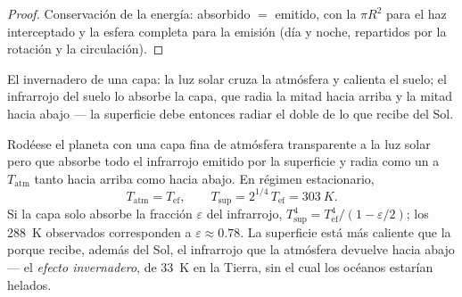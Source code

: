 \begin{proof}
Conservación de la energía: absorbido $= $ emitido, con la  $\pi R^2$
para el haz interceptado y la esfera completa para la emisión (día y
noche, repartidos por la rotación y la circulación).
\end{proof}

\begin{omfigure}

{\small El invernadero de una capa: la luz solar cruza la atmósfera y
calienta el suelo; el infrarrojo del suelo lo absorbe la capa, que
radia la mitad hacia arriba y la mitad hacia abajo --- la superficie debe entonces radiar el doble
de lo que recibe del Sol.}
\end{omfigure}

\begin{proposition}\label{prop:b2:thermal-radiation:greenhouse}
Rodéese el planeta con una capa fina de atmósfera transparente
a la luz solar pero que absorbe todo el infrarrojo emitido por la superficie y
radia como un  a $T_{\text{atm}}$ tanto hacia arriba como hacia abajo. En
régimen estacionario,
\[
T_{\text{atm}} = T_{\text{ef}}, \qquad
T_{\text{sup}} = 2^{1/4}\,T_{\text{ef}} = \qty{303}{K} .
\]
Si la capa solo absorbe la fracción $\varepsilon$ del infrarrojo,
$T_{\text{sup}}^4 = T_{\text{ef}}^4/(1 - \varepsilon/2)$; los \qty{288}{K}
observados corresponden a $\varepsilon \approx 0.78$. La superficie está
más caliente que la  porque recibe, además
del Sol, el infrarrojo que la atmósfera devuelve hacia abajo --- el
\emph{efecto invernadero}, de \qty{33}{K} en la Tierra,
sin el cual los océanos estarían helados.
\end{proposition}

